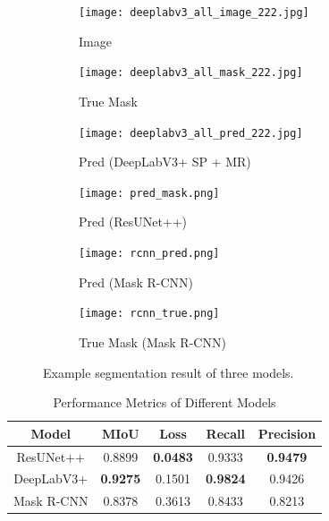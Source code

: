 \documentclass[conference]{IEEEtran}
\begin{document}
\begin{figure}[!t]
    \centering
    \begin{subfigure}[t]{0.23\textwidth}
        \centering
        \texttt{[image: deeplabv3\_all\_image\_222.jpg]}
        \caption{Image}
    \end{subfigure}
    \hfill
    \begin{subfigure}[t]{0.23\textwidth}
        \centering
        \texttt{[image: deeplabv3\_all\_mask\_222.jpg]}
        \caption{True Mask}
    \end{subfigure}
    \vspace{0.5em}
    \begin{subfigure}[t]{0.23\textwidth}
        \centering
        \texttt{[image: deeplabv3\_all\_pred\_222.jpg]}
        \caption{Pred (DeepLabV3+ SP + MR)}
    \end{subfigure}
    \hfill
    \begin{subfigure}[t]{0.23\textwidth}
        \centering
        \texttt{[image: pred\_mask.png]}
        \caption{Pred (ResUNet++)}
    \end{subfigure}

    \vspace{0.5em}
    \begin{subfigure}[t]{0.23\textwidth}
        \centering
        \texttt{[image: rcnn\_pred.png]}
        \caption{Pred (Mask R-CNN)}
    \end{subfigure}
    \hfill
    \begin{subfigure}[t]{0.23\textwidth}
        \centering
        \texttt{[image: rcnn\_true.png]}
        \caption{True Mask (Mask R-CNN)}
    \end{subfigure}

    \caption{Example segmentation result of three models. }
\end{figure}

\begin{table}[h]
\centering
\renewcommand{\arraystretch}{1.2} %
\setlength{\tabcolsep}{6pt} %
\caption{Performance Metrics of Different Models}
\begin{tabular}{|c|c|c|c|c|}
\hline
\textbf{Model} & \textbf{MIoU} & \textbf{Loss} & \textbf{Recall} & \textbf{Precision} \\ \hline
ResUNet++ & 0.8899 & \textbf{0.0483} & 0.9333 & \textbf{0.9479} \\ \hline
DeepLabV3+ & \textbf{0.9275} & 0.1501 & \textbf{0.9824} & 0.9426 \\ \hline
Mask R-CNN & 0.8378 & 0.3613 & 0.8433 & 0.8213 \\ \hline
\end{tabular}
\end{table}
\end{document}
